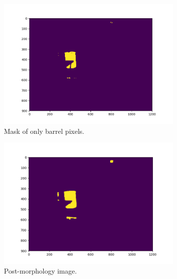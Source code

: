 \documentclass[a4paper]{article}
\begin{document}
\begin{figure}[!tbp]
  \centering
  \begin{subfigure}[b]{.4\textwidth}
    \includegraphics[width=1.3\textwidth]{barrel_mask.png}
\caption{\label{fig:mask_image}Mask of only barrel pixels.}
  \end{subfigure}
  \begin{subfigure}[b]{.4\textwidth}
    \includegraphics[width=1.3\textwidth]{Morphed_image.png}
\caption{\label{fig:morph_image}Post-morphology image.}
  \end{subfigure}
  \caption{\label{fig:second_set}}
\end{figure}
\end{document}
